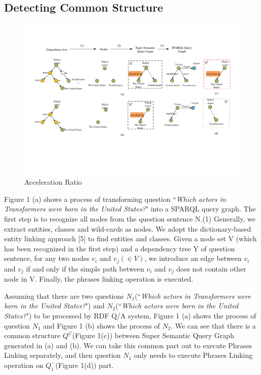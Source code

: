 \documentclass[runningheads]{llncs}
\begin{document}
\subsection{Detecting Common Structure}
\begin{figure}
	\centering
	\label{process}
	\includegraphics[width=\textwidth]{process.pdf}
	\caption{Acceleration Ratio}
\end{figure}
Figure 1 (a) shows a process of transforming question ``\textit{Which actors in Transformers were born in the United States?}" into a SPARQL query graph. The first step is to recognize all nodes from the question sentence N.(1) Generally, we extract entities, classes and wild-cards as nodes. We adopt the dictionary-based entity linking approach [5] to find entities and classes. Given a node set V (which has been recognized in the first step) and a dependency tree Y of question sentence, for any two nodes $v_{i}$ and $v_{j}(\in V)$, we introduce an edge between $v_{i}$ and $v_{j}$ if and only if the simple path between $v_{i}$ and $v_{j}$ does not contain other node in V. Finally, the phrases linking operation is executed.

Assuming that there are two questions $N_{1}$(``\textit{Which actors in Transformers were born in the United States?}") and $N_{2}$(``\textit{Which actors were born in the United States?}") to be processed by RDF Q/A system, Figure 1 (a) shows the process of question $N_{1}$ and Figure 1 (b) shows the process of $N_{2}$. We can see that there is a common structure $Q^{C}$(Figure 1(c)) between Super Semantic Query Graph generated in (a) and (b). We can take this common part out to execute Phrases Linking separately, and then question $N_{1}$ only needs to execute Phrases Linking operation on $Q_{1}^{-}$(Figure 1(d)) part.
\end{document}
